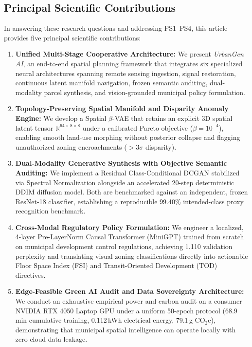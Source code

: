 \documentclass[journal]{IEEEtran}
\begin{document}
\subsection{Principal Scientific Contributions}
In answering these research questions and addressing PS1--PS4, this article provides five principal scientific contributions:
\begin{enumerate}
    \item \textbf{Unified Multi-Stage Cooperative Architecture:} We present \textit{UrbanGen AI}, an end-to-end spatial planning framework that integrates six specialized neural architectures spanning remote sensing ingestion, signal restoration, continuous latent manifold navigation, frozen semantic auditing, dual-modality parcel synthesis, and vision-grounded municipal policy formulation.
    \item \textbf{Topology-Preserving Spatial Manifold and Disparity Anomaly Engine:} We develop a Spatial $\beta$-VAE that retains an explicit 3D spatial latent tensor $\mathbb{R}^{64 \times 8 \times 8}$ under a calibrated Pareto objective ($\beta = 10^{-4}$), enabling smooth land-use morphing without posterior collapse and flagging unauthorized zoning encroachments ($>3\sigma$ disparity).
    \item \textbf{Dual-Modality Generative Synthesis with Objective Semantic Auditing:} We implement a Residual Class-Conditional DCGAN stabilized via Spectral Normalization alongside an accelerated 20-step deterministic DDIM diffusion model. Both are benchmarked against an independent, frozen ResNet-18 classifier, establishing a reproducible 99.40\% intended-class proxy recognition benchmark.
    \item \textbf{Cross-Modal Regulatory Policy Formulation:} We engineer a localized, 4-layer Pre-LayerNorm Causal Transformer (MiniGPT) trained from scratch on municipal development control regulations, achieving 1.110 validation perplexity and translating visual zoning classifications directly into actionable Floor Space Index (FSI) and Transit-Oriented Development (TOD) directives.
    \item \textbf{Edge-Feasible Green AI Audit and Data Sovereignty Architecture:} We conduct an exhaustive empirical power and carbon audit on a consumer NVIDIA RTX 4050 Laptop GPU under a uniform 50-epoch protocol (68.9\,min cumulative training, 0.112\,kWh electrical energy, 79.1\,g CO$_2$e), demonstrating that municipal spatial intelligence can operate locally with zero cloud data leakage.
\end{enumerate}
\end{document}
